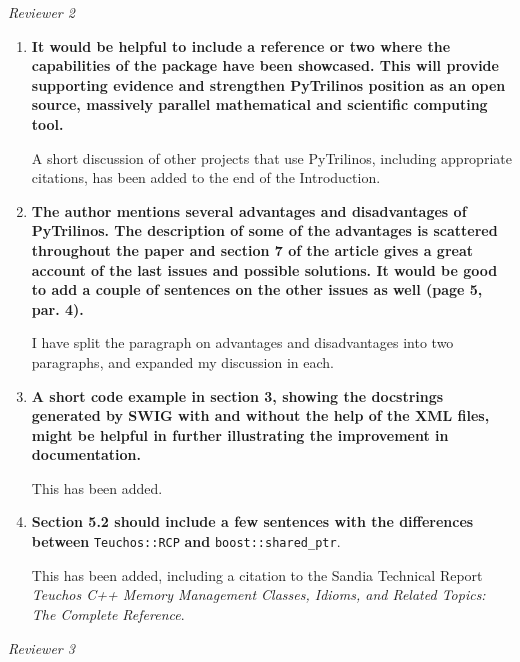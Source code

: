 \documentclass[11pt]{article}
\begin{document}
{\em Reviewer 2}

\begin{enumerate}

\item {\bf It would be helpful to include a reference or two where the capabilities of the package have been showcased.  This will provide supporting evidence and strengthen PyTrilinos position as an open source, massively parallel mathematical and scientific computing tool.}

A short discussion of other projects that use PyTrilinos, including appropriate citations, has been added to the end of the Introduction.

\item {\bf The author mentions several advantages and disadvantages of PyTrilinos. The description of some of the advantages is scattered throughout the paper and section 7 of the article gives a great account of the last issues and possible solutions.  It would be good to add a couple of sentences on the other issues as well (page 5, par. 4).}

I have split the paragraph on advantages and disadvantages into two paragraphs, and expanded my discussion in each.

\item {\bf A short code example in section 3, showing the docstrings generated by SWIG with and without the help of the XML files, might be helpful in further illustrating the improvement in documentation.}

This has been added.

\item {\bf Section 5.2 should include a few sentences with the differences between} {\tt Teuchos::RCP} {\bf and} {\tt boost::shared\_ptr}.

This has been added, including a citation to the Sandia Technical Report {\em Teuchos C++ Memory Management Classes, Idioms, and Related Topics: The Complete Reference}.

\end{enumerate}

{\em Reviewer 3}
\end{document}
